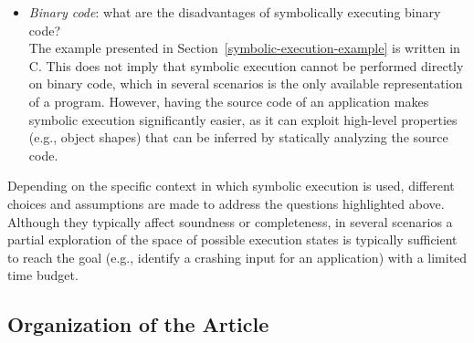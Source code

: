 \begin{itemize}
  \item {\em Binary code}: what are the disadvantages of symbolically executing binary code? \\
  The example presented in Section~\ref{symbolic-execution-example} is written in C. This does not imply that symbolic execution cannot be performed directly on binary code, which in several scenarios is the only available representation of a program. However, having the source code of an application makes symbolic execution significantly easier, as it can exploit high-level properties (e.g., object shapes) that can be inferred by statically analyzing the source code.
   
\end{itemize}
Depending on the specific context in which symbolic execution is used, different choices and assumptions are made to address the questions highlighted above. Although they typically affect soundness or completeness, in several scenarios a partial exploration of the space of possible execution states is typically sufficient to reach the goal (e.g., identify a crashing input for an application) with a limited time budget.


\subsection{Organization of the Article}

